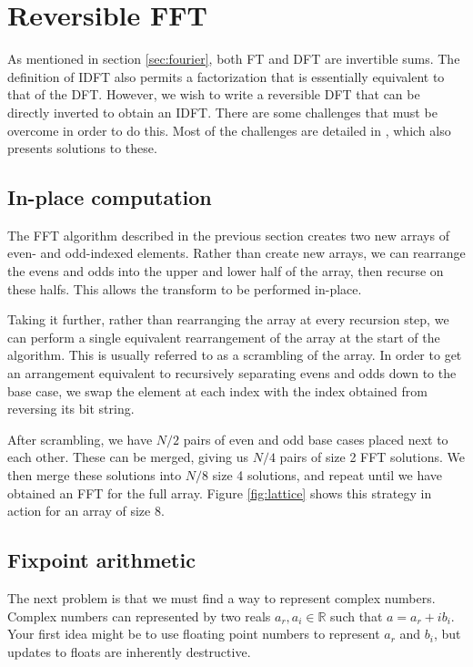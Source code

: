 \section{Reversible FFT}
As mentioned in section \ref{sec:fourier},
both FT and DFT are invertible sums.
The definition of IDFT also permits a factorization that is essentially equivalent to that of the DFT.
However, we wish to write a reversible DFT that can be directly inverted to obtain an IDFT.
There are some challenges that must be overcome in order to do this.
Most of the challenges are detailed in \cite{intfft}, which also presents solutions to these.

\subsection{In-place computation}
The FFT algorithm described in the previous section
creates two new arrays of even- and odd-indexed elements.
Rather than create new arrays,
we can rearrange the evens and odds into the upper and lower half of the array,
then recurse on these halfs.
This allows the transform to be performed in-place.

Taking it further, rather than rearranging the array at every recursion step,
we can perform a single equivalent rearrangement of the array at the start of the algorithm.
This is usually referred to as a scrambling of the array.
In order to get an arrangement equivalent to recursively separating evens and odds down to the base case,
we swap the element at each index with the index obtained from reversing its bit string.

After scrambling,
we have $N/2$ pairs of even and odd base cases placed next to each other.
These can be merged, giving us $N/4$ pairs of size 2 FFT solutions.
We then merge these solutions into $N/8$ size 4 solutions,
and repeat until we have obtained an FFT for the full array.
Figure \ref{fig:lattice} shows this strategy in action for an array of size 8.


\subsection{Fixpoint arithmetic}
The next problem is that we must find a way to represent complex numbers.
Complex numbers can represented by two reals $a_r, a_i \in \mathbb{R}$ such that $a = a_r + ib_i$.
Your first idea might be to use floating point numbers to represent $a_r$ and $b_i$,
but updates to floats are inherently destructive.

